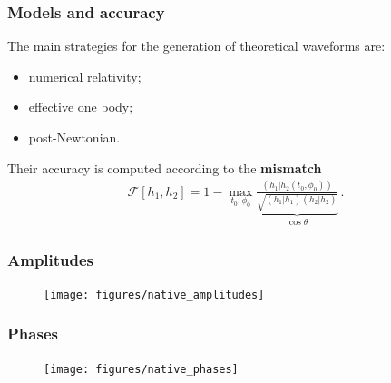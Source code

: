 \documentclass{beamer}
\begin{document}
\begin{frame}
    \frametitle{Models and accuracy}
    The main strategies for the generation of theoretical waveforms are: 
    \begin{itemize}
        \item numerical relativity;
        \item effective one body;
        \item post-Newtonian.
    \end{itemize}
    
    Their accuracy is computed according to the \textbf{mismatch}
    \begin{align}
        \mathcal{F}[h_1, h_2 ] = 1 - \max_{t_0 , \phi_0 } \underbrace{\frac{(h_1 | h_2 (t_0, \phi_0 ))}{\sqrt{(h_1 | h_1 ) (h_2 | h_2 )}}}_{\cos \theta }
        \,.
    \end{align}
\end{frame}

\begin{frame}
    \frametitle{Amplitudes}
    \begin{figure}[ht]
    \centering
    \texttt{[image: figures/native\_amplitudes]}
    \label{fig:native_amplitudes}
    \end{figure}
\end{frame}

\begin{frame}
    \frametitle{Phases}
    \begin{figure}[ht]
    \centering
    \texttt{[image: figures/native\_phases]}
    \label{fig:native_phases}
    \end{figure}
\end{frame}

\end{document}
